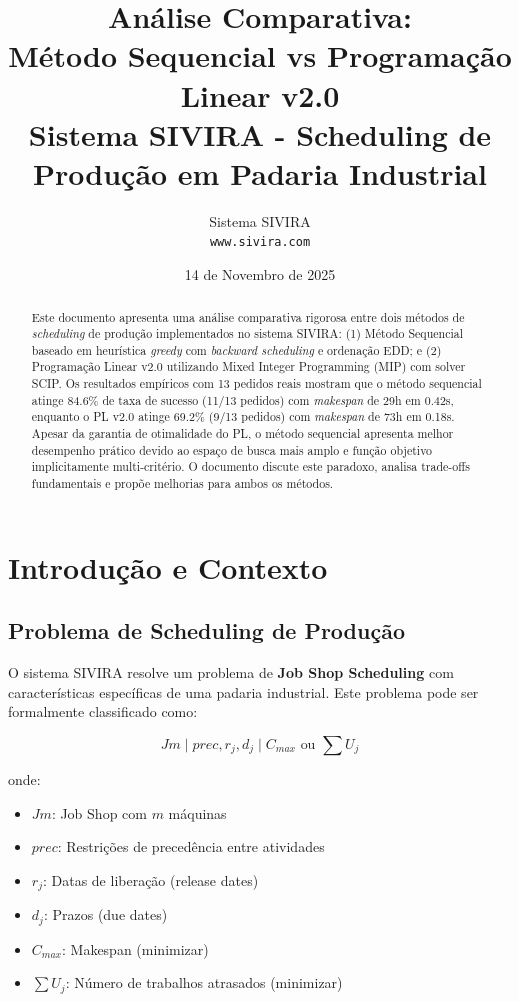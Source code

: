 \documentclass[12pt,a4paper]{article}
\title{
    \textbf{Análise Comparativa:}\\
    \textbf{Método Sequencial vs Programação Linear v2.0}\\
    \vspace{0.5cm}
    \large Sistema SIVIRA - Scheduling de Produção em Padaria Industrial
}
\author{
    Sistema SIVIRA\\
    \texttt{www.sivira.com}
}
\date{14 de Novembro de 2025}
\theoremstyle{definition}
\begin{document}
\maketitle

\begin{abstract}
Este documento apresenta uma análise comparativa rigorosa entre dois métodos de \textit{scheduling} de produção implementados no sistema SIVIRA: (1) Método Sequencial baseado em heurística \textit{greedy} com \textit{backward scheduling} e ordenação EDD; e (2) Programação Linear v2.0 utilizando Mixed Integer Programming (MIP) com solver SCIP. Os resultados empíricos com 13 pedidos reais mostram que o método sequencial atinge 84.6\% de taxa de sucesso (11/13 pedidos) com \textit{makespan} de 29h em 0.42s, enquanto o PL v2.0 atinge 69.2\% (9/13 pedidos) com \textit{makespan} de 73h em 0.18s. Apesar da garantia de otimalidade do PL, o método sequencial apresenta melhor desempenho prático devido ao espaço de busca mais amplo e função objetivo implicitamente multi-critério. O documento discute este paradoxo, analisa trade-offs fundamentais e propõe melhorias para ambos os métodos.
\end{abstract}

\tableofcontents

\newpage

\section{Introdução e Contexto}

\subsection{Problema de Scheduling de Produção}

O sistema SIVIRA resolve um problema de \textbf{Job Shop Scheduling} com características específicas de uma padaria industrial. Este problema pode ser formalmente classificado como:

\begin{equation}
Jm \mid prec, r_j, d_j \mid C_{max} \text{ ou } \sum U_j
\end{equation}

onde:
\begin{itemize}
    \item $Jm$: Job Shop com $m$ máquinas
    \item $prec$: Restrições de precedência entre atividades
    \item $r_j$: Datas de liberação (release dates)
    \item $d_j$: Prazos (due dates)
    \item $C_{max}$: Makespan (minimizar)
    \item $\sum U_j$: Número de trabalhos atrasados (minimizar)
\end{itemize}
\end{document}
